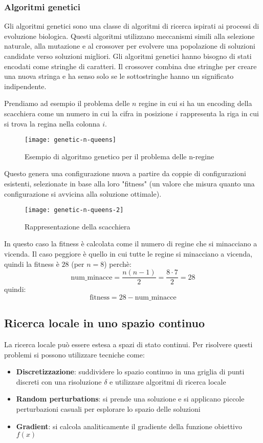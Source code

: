 \documentclass[a4paper]{article}
\begin{document}
\subsubsection{Algoritmi genetici}
Gli algoritmi genetici sono una classe di algoritmi di ricerca ispirati ai
processi di evoluzione biologica. Questi algoritmi utilizzano meccanismi simili
alla selezione naturale, alla mutazione e al crossover per evolvere una popolazione
di soluzioni candidate verso soluzioni migliori. Gli algoritmi genetici hanno bisogno
di stati encodati come stringhe di caratteri. Il crossover combina due stringhe
per creare una nuova stringa e ha senso solo se le sottostringhe hanno un significato
indipendente.
\begin{example}
  Prendiamo ad esempio il problema delle \( n \) regine in cui si ha un encoding
  della scacchiera come un numero in cui la cifra in posizione \( i \) rappresenta
  la riga in cui si trova la regina nella colonna \( i \).
  \begin{figure}[H]
    \centering
    \texttt{[image: genetic-n-queens]}
    \caption{Esempio di algoritmo genetico per il problema delle n-regine}
  \end{figure}
  \noindent
  Questo genera una configurazione nuova a partire da coppie di configurazioni
  esistenti, selezionate in base alla loro "fitness" (un valore che misura
  quanto una configurazione si avvicina alla soluzione ottimale).
  \begin{figure}[H]
    \centering
    \texttt{[image: genetic-n-queens-2]}
    \caption{Rappresentazione della scacchiera}
  \end{figure}
  \noindent
  In questo caso la fitness è calcolata come il numero di regine che si minacciano
  a vicenda. Il caso peggiore è quello in cui tutte le regine si minacciano a vicenda,
  quindi la fitness è \( 28 \) (per \( n = 8 \)) perchè:
  \[
    \text{num\_minacce} = \frac{n(n-1)}{2} = \frac{8 \cdot 7}{2} = 28
  \] 
  quindi:
  \[
    \text{fitness} = 28 - \text{num\_minacce}
  \] 
\end{example}

\subsection{Ricerca locale in uno spazio continuo}
La ricerca locale può essere estesa a spazi di stato continui. Per risolvere questi
problemi si possono utilizzare tecniche come:
\begin{itemize}
  \item \textbf{Discretizzazione}: suddividere lo spazio continuo in una griglia di punti
    discreti con una risoluzione \( \delta \) e utilizzare algoritmi di ricerca locale
  \item \textbf{Random perturbations}: si prende una soluzione e si applicano piccole
    perturbazioni casuali per esplorare lo spazio delle soluzioni
  \item \textbf{Gradient}: si calcola analiticamente il gradiente della
    funzione obiettivo \( f(x) \) 
\end{itemize}
\end{document}
